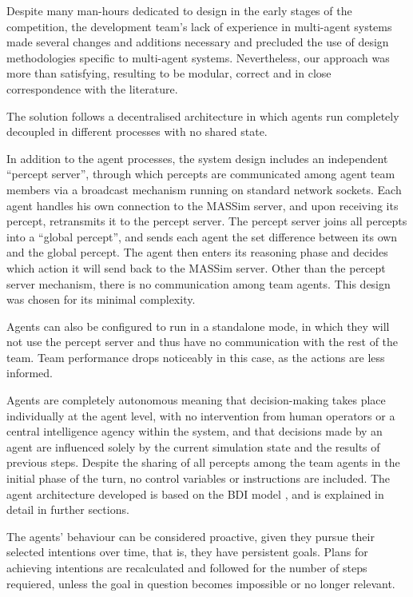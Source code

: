 \documentclass{llncs2e/llncs}
\begin{document}
    Despite many man-hours dedicated to design in the early stages of the
    competition, the development team's lack of experience in multi-agent
    systems made several changes and additions necessary and precluded the use
    of design methodologies specific to multi-agent systems.  Nevertheless, our
    approach was more than satisfying, resulting to be modular, correct and in
    close correspondence with the literature.

    The solution follows a decentralised architecture in which agents run
    completely decoupled in different processes with no shared state. 
    
    In addition to the agent processes, the system design includes an
    independent ``percept server'', through which percepts are communicated
    among agent team members via a broadcast mechanism running on standard
    network sockets.  Each agent handles his own connection to the MASSim
    server, and upon receiving its percept, retransmits it to the percept
    server.  The percept server joins all percepts into a ``global percept'',
    and sends each agent the set difference between its own and the global
    percept.  The agent then enters its reasoning phase and decides which
    action it will send back to the MASSim server.  Other than the percept
    server mechanism, there is no communication among team agents. This design
    was chosen for its minimal complexity.

    Agents can also be configured to run in a standalone mode, in which they will
    not use the percept server and thus have no communication with the rest of
    the team.  Team performance drops noticeably in this case, as the actions
    are less informed. 

    Agents are completely autonomous meaning that decision-making takes place
    individually at the agent level, with no intervention from human operators
    or a central intelligence agency within the system, and that decisions made
    by an agent are influenced solely by the current simulation state and the
    results of previous steps.  
    Despite the sharing of all percepts among the team agents in the initial
    phase of the turn, no control variables or instructions are included. 
    The agent architecture developed is based on the
    BDI model \cite{Rao:1991}, and is explained in detail in further sections.

    The agents' behaviour can be considered proactive, given they pursue their 
    selected intentions over time, that is, they have persistent goals. Plans 
    for achieving intentions are recalculated and followed for the number of
    steps requiered, unless the goal in question becomes impossible or no longer
    relevant.
\end{document}
